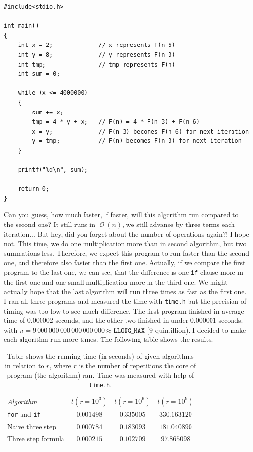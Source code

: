 \documentclass{book}
\DeclareMathOperator{\bigo}{\mathcal{O}}
\begin{document}
\begin{verbatim}
#include<stdio.h>

int main()
{
    int x = 2;             // x represents F(n-6)
    int y = 8;             // y represents F(n-3)
    int tmp;               // tmp represents F(n)
    int sum = 0;
    
    while (x <= 4000000)
    {
        sum += x;
        tmp = 4 * y + x;   // F(n) = 4 * F(n-3) + F(n-6)
        x = y;             // F(n-3) becomes F(n-6) for next iteration
        y = tmp;           // F(n) becomes F(n-3) for next iteration
    }
    
    printf("%d\n", sum);
    
    return 0;
}
\end{verbatim}

Can you guess, how much faster, if faster, will this algorithm run compared to the second one? It still runs in $\bigo(n)$, we still advance by three terms each iteration... But hey, did you forget about the number of operations again?! I hope not. This time, we do one multiplication more than in second algorithm, but two summations less. Therefore, we expect this program to run faster than the second one, and therefore also faster than the first one. Actually, if we compare the first program to the last one, we can see, that the difference is one \texttt{if} clause more in the first one and one small multiplication more in the third one. We might actually hope that the last algorithm will run three times as fast as the first one.\\

I ran all three programs and measured the time with \texttt{time.h} but the precision of timing was too low to see much difference. The first program finished in average time of $0.000002$ seconds, and the other two finished in under $0.000001$ seconds. with $n = 9\,000\,000\,000\,000\,000\,000 \approx \texttt{LLONG\_MAX}$ ($9$ quintillion). I decided to make each algorithm run more times. The following table shows the results.

\begin{table}[h!]
\centering
\begin{tabular}{||l||c|c|c||}
\hhline{|t:====:t|}
\textit{Algorithm} & $t(r = 10^3)$ & $t(r = 10^6)$ & $t(r = 10^9)$\\ \hhline{||=||=|=|=||}
\texttt{for} and \texttt{if} & $0.001498$ & $0.335005$ & $330.163120$\\ \hhline{||-||-|-|-||}
Naive three step & $0.000784$ & $0.183093$ & $181.040890$\\ \hhline{||-||-|-|-||}
Three step formula & $0.000215$ & $0.102709$ & $97.865098$\\ \hhline{|b:====:b|}
\end{tabular}
\caption{Table shows the running time (in seconds) of given algorithms in relation to $r$, where $r$ is the number of repetitions the core of program (the algorithm) ran. Time was measured with help of \texttt{time.h}.}
\end{table}
\end{document}
